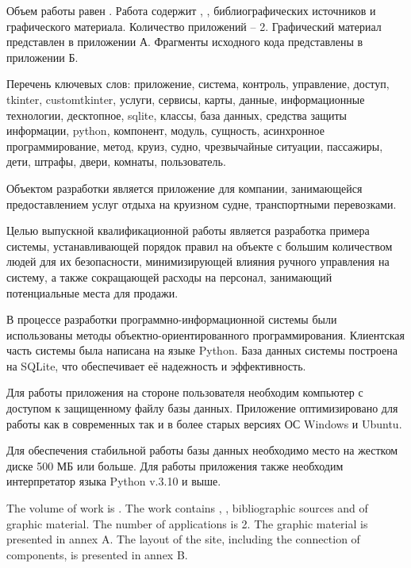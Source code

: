 
Объем работы равен . Работа содержит , ,  библиографических источников и  графического материала. Количество приложений – 2. Графический материал представлен в приложении А. Фрагменты исходного кода представлены в приложении Б.

Перечень ключевых слов: приложение, система, контроль, управление, доступ, tkinter, customtkinter, услуги, сервисы, карты, данные, информационные технологии, десктопное, sqlite, классы, база данных, средства защиты информации, python, компонент, модуль, сущность, асинхронное программирование, метод, круиз, судно, чрезвычайные ситуации, пассажиры, дети, штрафы, двери, комнаты, пользователь.

Объектом разработки является приложение для компании,  занимающейся предоставлением услуг отдыха на круизном судне, транспортными перевозками.

Целью выпускной квалификационной работы является разработка примера системы, устанавливающей порядок правил на объекте с большим количеством людей для их безопасности, минимизирующей влияния ручного управления на систему, а также сокращающей расходы на персонал, занимающий потенциальные места для продажи.

В процессе разработки программно-информационной системы были использованы методы объектно-ориентированного программирования. Клиентская часть системы была написана на языке Python. База данных системы построена на SQLite, что обеспечивает её надежность и эффективность.

Для работы приложения на стороне пользователя необходим компьютер с доступом к защищенному файлу базы данных. Приложение оптимизировано для работы как в современных так и в более старых версиях ОС Windows и Ubuntu.

Для обеспечения стабильной работы базы данных необходимо место на жестком диске 500 МБ или больше. Для работы приложения также необходим интерпретатор языка Python v.3.10 и выше.

  
The volume of work is . The work contains , ,  bibliographic sources and  of graphic material. The number of applications is 2. The graphic material is presented in annex A. The layout of the site, including the connection of components, is presented in annex B.

